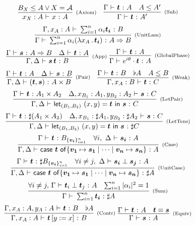 \documentclass[runningheads,orivec,envcountsame,envcountsect]{llncs}
\newcommand\AbsBasis{\ensuremath{\mathcal{A}}}
\def\Pair#1#2{(#1,#2)} %
\def\Lam#1#2#3{\lambda#1_{#2}\,{.}\,#3} %
\def\letkeyword{\mathsf{let}}
\def\inkeyword{\mathsf{in}}
\def\LetP#1#2#3#4#5#6{\letkeyword_{\Pair{#2}{#4}}~\Pair{#1}{#3}=#5~\inkeyword~#6}
\def\gencase#1#2#3#4#5{\ensuremath{\mathsf{case}~#1~\mathsf{of} \{#2\mapsto #4 \mid \dotsb \mid #3\mapsto #5\}}}
\def\Arr{\Rightarrow}
\def\SUB#1#2{#1\le#2}
\def\TYP#1#2#3{#1~{\vdash}~#2~{:}~#3}
\def\SORTH#1#2#3#4{#1~{\vdash}~#2\perp#3~{:}~#4}
\def\snam#1{\textsc{\scriptsize\upshape(#1)}}
\newcommand\basis[1]{\ensuremath{B_{ #1 }}}
\newcommand\genbasis[3]{\ensuremath{B_{\{#1\}_{#2}^{#3}}}}
\begin{document}
\begin{table*}
    \small
    $
    \begin{array}{c}
    \infer[\snam{Axiom}]{\TYP{x_X:A}{x}{A}}{\basis{X}\leq A \vee X=\AbsBasis}\quad
    \infer[\snam{Sub}]{\TYP{\Gamma}{\vec{t}}{A'}}{
        \TYP{\Gamma}{\vec{t}}{A} & \SUB{A}{A'}
    }\\
    \noalign{\medskip}
    \infer[\snam{UnitLam}]{
        \TYP{\Gamma}{\sum_{i=1}^n \alpha_i (\Lam{x}{A}{\vec{t_i}})}{A\Arr B}
    }{\TYP{\Gamma,x_A: A}{\sum_{i=1}^{n}\alpha_i\vec{t_i}}{B}
    }\\
    \noalign{\medskip}
    \infer[\snam{App}]{\TYP{\Gamma,\Delta}{\vec{s}\,\vec{t}}{B}}{
        \TYP{\Gamma}{\vec{s}}{A\Arr B} & \TYP{\Delta}{\vec{t}}{A}
    }\ 
    \infer[\snam{GlobalPhase}]{\TYP{\Gamma}{e^{i\theta}\cdot\vec{t}}{A}}
    {\TYP{\Gamma}{\vec{t}}{A}}
    \\
    \noalign{\medskip}
    \infer[\snam{Pair}]{\TYP{\Gamma,\Delta}
        {\Pair{\vec{t}}{\vec{s}}}{A\times B}}{
        \TYP{\Gamma}{\vec{t}}{A}&\TYP{\Delta}{\vec{s}}{B}
    }\quad
    \infer[\snam{Weak}]{\TYP{\Gamma,x_A:B}{\vec{t}}{C}}{
        \TYP{\Gamma}{\vec{t}}{B}& \flat{A} & A\leq B
    }
    \\
    \noalign{\medskip}
    \infer[\snam{LetPair}]{\TYP{\Gamma,\Delta} 
        {\LetP{x}{B_1}{y}{B_2}{\vec{t}}{\vec{s}}}{C}}{
        \TYP{\Gamma}{\vec{t}}{A_1\times A_2}&
        \TYP{\Delta,x_{B_1}:A_1,y_{B_2}:A_2}{\vec{s}}{C}
    }\\
    \noalign{\medskip}
    \infer[\snam{LetTens}]{\TYP{\Gamma,\Delta}
        {\LetP{x}{B_1}{y}{B_2}{\vec{t}}{\vec{s}}}{\sharp C}}{
        \TYP{\Gamma}{\vec{t}}{\sharp(A_1\times A_2)}&
        \TYP{\Delta,x_{B_1}:\sharp A_1,y_{B_2}:\sharp A_2}{\vec{s}}{C}
    }\\
    \noalign{\medskip}
    \infer[\snam{Case}]{\TYP{\Gamma,\Delta}
        {\gencase{\vec{t}}{\vec{v_1}}{\vec{v_n}}{\vec{s_1}}{\vec{s_n}}}{A}}{
        \TYP{\Gamma}{\vec{t}}{\genbasis{\vec{v_i}}{i=1}{n}}&
        \forall i,\ \TYP{\Delta}{\vec{s_i}}{A}
    }\\
    \noalign{\medskip}
    \infer[\snam{UnitCase}]{\TYP{\Gamma,\Delta}
        {\gencase{\vec{t}}{\vec{v_1}}{\vec{v_n}}{\vec{s_1}}{\vec{s_n}}}{\sharp A}}{
        \TYP{\Gamma}{\vec{t}}{\sharp \genbasis{\vec{v_i}}{i=1}{n}}&
        \forall i\neq j,\ \SORTH{\Delta}{\vec{s_i}}{\vec{s_j}}{A}
    }\\
    \noalign{\medskip}
    \infer[\snam{Sum}]
        {\TYP{\Gamma}{\sum_{i=1}^{n} \vec{t_i}}{\sharp A}}
        {\forall i\neq j,\, \SORTH{\Gamma}{\vec t_i}{\vec t_j}{A} &
        \sum_{i=1}^{n}|\alpha_i|^2 = 1}
    \\
    \noalign{\medskip}
    \infer[\snam{Contr}]{\TYP{\Gamma,x_A:A}{\vec{t}\,[y:=x]}{B}}{
        \TYP{\Gamma,x_A:A,y_A:A}{\vec{t}}{B}&\flat{A}
    }\ 
    \infer[\snam{Equiv}]{\TYP{\Gamma}{\vec{s}}{A}}{
        \TYP{\Gamma}{\vec{t}}{A}& \vec t\equiv \vec s
    }\\
    \noalign{\medskip}
    \end{array}
    $


\end{table*}
\end{document}
